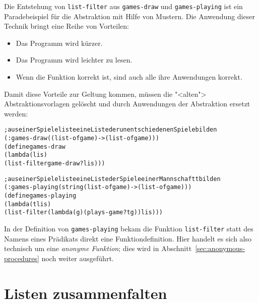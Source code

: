 Die Entstehung von \texttt{list-filter} aus \texttt{games-draw} und
\texttt{games-playing} ist ein Paradebeispiel für die Abstraktion mit
Hilfe von Mustern.  Die Anwendung dieser Technik bringt eine Reihe von
Vorteilen:
%
\begin{itemize}
\item Das Programm wird kürzer.
\item Das Programm wird leichter zu lesen.
\item Wenn die Funktion korrekt ist, sind auch alle ihre Anwendungen
  korrekt.
\end{itemize}
%
Damit diese Vorteile zur Geltung kommen, müssen die "<alten">
Abstraktionsvorlagen gelöscht und durch Anwendungen der Abstraktion
ersetzt werden:
%
\begin{alltt}
; aus einer Spieleliste eine Liste der unentschiedenen Spiele bilden
(: games-draw ((list-of game) -> (list-of game)))
(define games-draw
  (lambda (lis)
    (list-filter game-draw? lis)))

; aus einer Spieleliste eine Liste der Spiele einer Mannschaft t bilden
(: games-playing (string (list-of game) -> (list-of game)))
(define games-playing
  (lambda (t lis)
    (list-filter (lambda (g) (plays-game? t g)) lis)))
\end{alltt}
%
In der Definition von \texttt{games-playing} bekam die Funktion
\texttt{list-filter} statt des Namens eines Prädikats direkt eine
Funktiondefinition.  Hier handelt es sich also technisch um eine \emph{anonyme
  Funktion}; dies wird in Abschnitt~\ref{sec:anonymous-procedures} noch weiter ausgeführt.

\section{Listen zusammenfalten}

